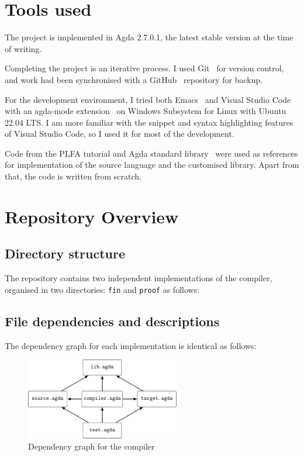 \documentclass[12pt,a4paper]{report}
\theoremstyle{definition}
\begin{document}

    \section{Tools used} \label{sec: tools}
    The project is implemented in Agda 2.7.0.1, the latest stable version at the time of writing.

    Completing the project is an iterative process. I used Git~\autocite{git} for version control, and work had been synchronised with a GitHub~\autocite{github} repository for backup.

    For the development environment, I tried both Emacs~\autocite{emacs} and Visual Studio Code~\autocite{vscode} with an agda-mode extension~\autocite{agda_mode} on Windows Subsystem for Linux with Ubuntu~\autocite{wsl_ubuntu} 22.04 LTS. I am more familiar with the snippet and syntax highlighting features of Visual Studio Code, so I used it for most of the development. 

    Code from the PLFA tutorial and Agda standard library~\autocite{agda_std} were used as references for implementation of the source language and the customised library. Apart from that, the code is written from scratch.

    \section{Repository Overview} \label{sec: repo_overview}
        \subsection{Directory structure}
        The repository contains two independent implementations of the compiler, organised in two directories: \texttt{fin} and \texttt{proof} as follows:

        \subsection{File dependencies and descriptions}
        The dependency graph for each implementation is identical as follows:
        \begin{figure}[H]
            \centering
            \includegraphics[width=0.6\textwidth]{dependencies.pdf}
            \caption{Dependency graph for the compiler}
            \label{fig: dependencies}
        \end{figure}
\end{document}
